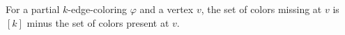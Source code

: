 \begin{definition}
For a partial $k$-edge-coloring $\varphi$ and a vertex $v$, the set of
colors missing at $v$ is $[k]$ minus the set of colors present at $v$.
\end{definition}
